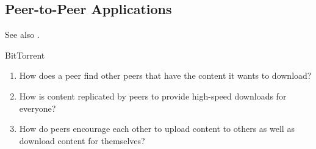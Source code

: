 \subsection{Peer-to-Peer Applications}

See also .
  
\begin{frame}{BitTorrent}

  \begin{center}
  \end{center}
  \begin{footnotesize}
    \begin{enumerate}
    \item How does a peer find other peers that have the content it wants to download?
    \item How is content replicated by peers to provide high-speed downloads for everyone?
    \item How do peers encourage each other to upload content to others as well as
      download content for themselves?
    \end{enumerate}
  \end{footnotesize}
\end{frame}

